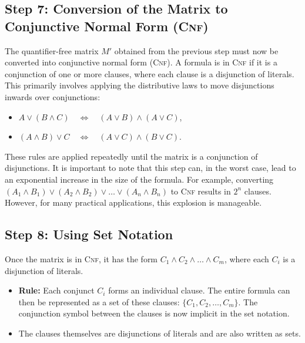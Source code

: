 \subsection{Step 7: Conversion of the Matrix to Conjunctive Normal Form (\textsc{Cnf})}

The quantifier-free matrix $M'$ obtained from the previous step must now be converted into conjunctive normal form (\textsc{Cnf}). A formula is in \textsc{Cnf} if it is a conjunction of one or more clauses, where each clause is a disjunction of literals. This primarily involves applying the distributive laws to move disjunctions inwards over conjunctions:
\begin{itemize}
\item $A \lor (B \land C) \quad\Leftrightarrow\quad (A \lor B) \land (A \lor C)$,
\item $(A \land B) \lor C \quad\Leftrightarrow\quad (A \lor C) \land (B \lor C)$.
\end{itemize}
These rules are applied repeatedly until the matrix is a conjunction of disjunctions. It is important to note
that this step can, in the worst case, lead to an exponential increase in the size of the formula. For example,
converting $(A_1 \land B_1) \lor (A_2 \land B_2) \lor \dots \lor (A_n \land B_n)$ to \textsc{Cnf} results in
$2^n$ clauses. However, for many practical applications, this explosion is manageable. 


\subsection{Step 8: Using Set Notation}
Once the matrix is in \textsc{Cnf}, it has the form $C_1 \land C_2 \land \dots \land C_m$, where each $C_i$ is a disjunction of literals.
\begin{itemize}
\item \textbf{Rule:} Each conjunct $C_i$ forms an individual clause. The entire formula can then be
      represented as a set of these clauses: $\{C_1, C_2, \dots, C_m\}$. The conjunction symbol between the
      clauses is now implicit in the set notation.
\item The clauses themselves are disjunctions of literals and are also written as sets.
\end{itemize}

